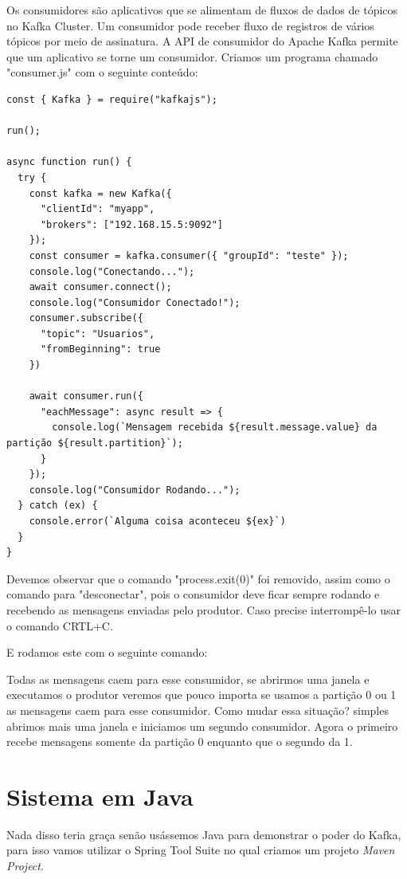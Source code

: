 \documentclass[a4paper,11pt]{article}
\begin{document}
Os consumidores são aplicativos que se alimentam de fluxos de dados de tópicos no Kafka Cluster. Um consumidor pode receber fluxo de registros de vários tópicos por meio de assinatura. A API de consumidor do Apache Kafka permite que um aplicativo se torne um consumidor. Criamos um programa chamado "consumer.js" com o seguinte conteúdo:
\begin{lstlisting}[]
const { Kafka } = require("kafkajs");

run();

async function run() {
  try {
    const kafka = new Kafka({
      "clientId": "myapp",
      "brokers": ["192.168.15.5:9092"]
    });
    const consumer = kafka.consumer({ "groupId": "teste" });
    console.log("Conectando...");
    await consumer.connect();
    console.log("Consumidor Conectado!");
    consumer.subscribe({
      "topic": "Usuarios",
      "fromBeginning": true
    })

    await consumer.run({
      "eachMessage": async result => {
        console.log(`Mensagem recebida ${result.message.value} da partição ${result.partition}`);
      }
    });
    console.log("Consumidor Rodando...");
  } catch (ex) {
    console.error(`Alguma coisa aconteceu ${ex}`)
  }
}
\end{lstlisting}

Devemos observar que o comando "process.exit(0)" foi removido, assim como o comando para "desconectar", pois o consumidor deve ficar sempre rodando e recebendo as mensagens enviadas pelo produtor. Caso precise interrompê-lo usar o comando CRTL+C.

E rodamos este com o seguinte comando:

Todas as mensagens caem para esse consumidor, se abrirmos uma janela e executamos o produtor veremos que pouco importa se usamos a partição 0 ou 1 as mensagens caem para esse consumidor. Como mudar essa situação? simples abrimos mais uma janela e iniciamos um segundo consumidor. Agora o primeiro recebe mensagens somente da partição 0 enquanto que o segundo da 1.

\section{Sistema em Java}
Nada disso teria graça senão usássemos Java para demonstrar o poder do Kafka, para isso vamos utilizar o Spring Tool Suite no qual criamos um projeto \textit{Maven Project}.
\end{document}
